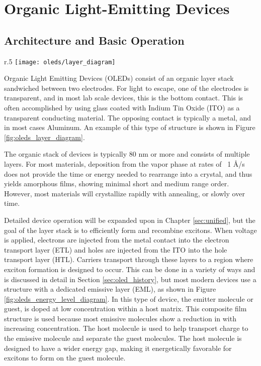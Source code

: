 \documentclass[../thesis.tex]{subfiles}
\begin{document}
\chapter{Organic Light-Emitting Devices}\label{sec:oleds}

\section{Architecture and Basic Operation} \label{sec:oled_operation}

\begin{wrapfigure}{r}{.5\textwidth}
\centering
\texttt{[image: oleds/layer\_diagram]}
\caption{Basic layer diagram for OLED devices.}
\label{fig:oleds_layer_diagram}
\end{wrapfigure}

Organic Light Emitting Devices (OLEDs) consist of an organic layer stack sandwiched between two electrodes.
For light to escape, one of the electrodes is transparent, and in most lab scale devices, this is the bottom contact.
This is often accomplished by using glass coated with Indium Tin Oxide (ITO) as a transparent conducting material.
The opposing contact is typically a metal, and in most cases Aluminum.
An example of this type of structure is shown in Figure \ref{fig:oleds_layer_diagram}.

The organic stack of devices is typically 80 nm or more and consists of multiple layers.
For most materials, deposition from the vapor phase at rates of ~1 \r{A}/s does not provide the time or energy needed to rearrange into a crystal, and thus yields amorphous films, showing minimal short and medium range order.\supercite{Tao2011,Shirota2007,Kafer2005,Maldonis2017,Maldonis2015,Zhang2017,Zhang2016a}
However, most materials will crystallize rapidly with annealing,\supercite{Fielitz2016} or slowly over time.\supercite{Scholz2015}

Detailed device operation will be expanded upon in Chapter \ref{sec:unified}, but the goal of the layer stack is to efficiently form and recombine excitons.
When voltage is applied, electrons are injected from the metal contact into the electron transport layer (ETL) and holes are injected from the ITO into the hole transport layer (HTL).
Carriers transport through these layers to a region where exciton formation is designed to occur.  
This can be done in a variety of ways and is discussed in detail in Section \ref{sec:oled_history}, but most modern devices use a structure with a dedicated emissive layer (EML), as shown in Figure \ref{fig:oleds_energy_level_diagram}.
In this type of device, the emitter molecule or guest, is doped at low concentration within a host matrix.\supercite{Baldo2000}
This composite film structure is used because most emissive molecules show a reduction in \pl with increasing concentration.\supercite{Turro1991a}
The host molecule is used to help transport charge to the emissive molecule and separate the guest molecules.
The host molecule is designed to have a wider energy gap, making it energetically favorable for excitons to form on the guest molecule.
\end{document}
